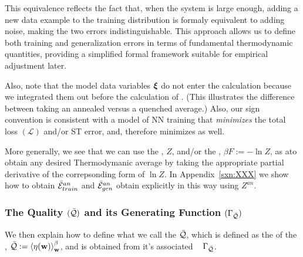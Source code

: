 This equivalence reflects the fact that, when the system is large enough, adding a new data example to the
training distribution is formaly equivalent to adding noise, making the two errors indistinguishable.
This approach allows us to define both training and generalization errors in terms of fundamental thermodynamic quantities,
providing a simplified formal framework suitable for empirical adjustment later.

Also, note that the model data variables $\boldsymbol{\xi}$ do not enter the calculation because we 
integrated them out before the calculation of \ThermalAverage.
(This illustrates the difference between taking an annealed versus a quenched average.)
Also, our sign convention is consistent with a model of NN training that \emph{minimizes} the total loss
$(\mathcal{L})$ and/or ST error, and, therefore minimizes \FreeEnergies as well.

More generally, we see that we can use the \PartitionFunction, $Z$,
and/or the \FreeEnergy, $\beta F:=-\ln Z$, as a\GeneratingFunction to obtain any
desired Thermodymanic average by taking the appropriate partial derivative
of the correpsonding form of $\ln Z$.
In Appendix~\ref{sxn:XXX} we show how to obtain 
$\bar{\mathcal{E}}_{train}^{an}$ and $\bar{\mathcal{E}}_{gen}^{an}$ obtain explicitly in this way using $Z^{an}$.


\subsubsection{The Quality $(\bar{\mathcal{Q}})$ and its Generating Function $(\Gamma_{\bar{\mathcal{Q}}})$}
We then explain how to define what we call the \Quality $\bar{\mathcal{Q}}$, which is
defined as the \ThermalAverage of the \SelfOverlap,  $\bar{\mathcal{Q}}:=\left\langle \eta({\mathbf{w}}) \right\rangle_{\mathbf w}^{\beta}$,
and is obtained from it's associated \emph{\Quality~\GeneratingFunction} $\Gamma_{\bar{\mathcal{Q}}}$.

